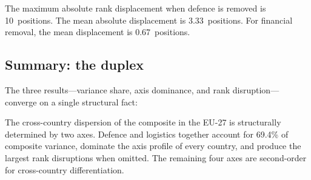 The maximum absolute rank displacement when defence is removed is
10~positions.  The mean absolute displacement is 3.33~positions.
For financial removal, the mean displacement is 0.67~positions.

\subsection{Summary: the duplex}

The three results---variance share, axis dominance, and
rank disruption---converge on a single structural fact:

\begin{tcolorbox}[
  colback=ISILight,
  colframe=ISIBlue,
  fonttitle=\bfseries\sffamily,
  title={The defence--logistics duplex}
]
The cross-country dispersion of the {\ISI} composite in the EU-27 is
structurally determined by two axes.  Defence and logistics together
account for 69.4\% of composite variance, dominate the axis profile of
every country, and produce the largest rank disruptions when omitted.
The remaining four axes are second-order for cross-country
differentiation.
\end{tcolorbox}
